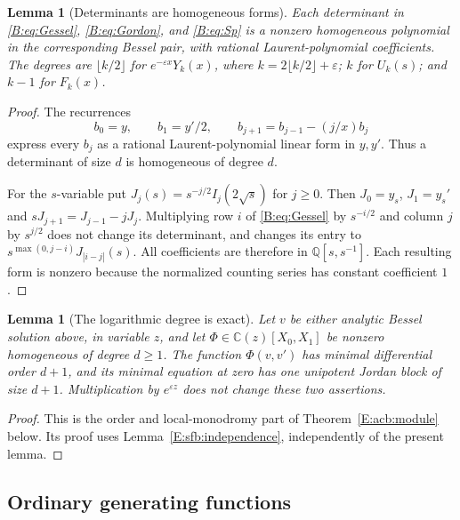 \documentclass[11pt,a4paper]{article}
\newtheorem{lemma}[theorem]{Lemma}
\theoremstyle{definition}
\theoremstyle{remark}
\numberwithin{equation}{section}
\begin{document}
\begin{lemma}[Determinants are homogeneous forms]\label{E:sfb:forms}
Each determinant in \eqref{B:eq:Gessel}, \eqref{B:eq:Gordon}, and \eqref{B:eq:Sp}
is a nonzero homogeneous polynomial in the corresponding Bessel
pair, with rational Laurent-polynomial coefficients.  The degrees
are $\lfloor k/2\rfloor$ for $e^{-\varepsilon x}Y_k(x)$,
where $k=2\lfloor k/2\rfloor+\varepsilon$; $k$ for $U_k(s)$;
and $k-1$ for $F_k(x)$.
\end{lemma}
\begin{proof}
The recurrences
\[
 b_0=y,\qquad b_1=y'/2,\qquad
 b_{j+1}=b_{j-1}-(j/x)b_j
\]
express every $b_j$ as a rational Laurent-polynomial linear
form in $y,y'$.  Thus a determinant of size $d$ is homogeneous
of degree $d$.

For the $s$-variable put
$J_j(s)=s^{-j/2}I_j(2\sqrt{s})$ for $j\ge0$.
Then $J_0=y_s$, $J_1=y_s'$ and
$sJ_{j+1}=J_{j-1}-jJ_j$.
Multiplying row $i$ of \eqref{B:eq:Gessel} by $s^{-i/2}$
and column $j$ by $s^{j/2}$ does not change its determinant,
and changes its entry to
$s^{\max(0,j-i)}J_{|i-j|}(s)$.
All coefficients are therefore in $\mathbb Q[s,s^{-1}]$.
Each resulting form is nonzero because the normalized counting
series has constant coefficient $1$.
\end{proof}

\begin{lemma}[The logarithmic degree is exact]\label{E:sfb:logblock}
Let $v$ be either analytic Bessel solution above, in variable $z$,
and let $\Phi\in\mathbb C(z)[X_0,X_1]$ be nonzero homogeneous
of degree $d\ge1$.  The function $\Phi(v,v')$ has minimal
differential order $d+1$, and its minimal equation at zero has
one unipotent Jordan block of size $d+1$.
Multiplication by $e^{\varepsilon z}$ does not change these
two assertions.
\end{lemma}
\begin{proof}
This is the order and local-monodromy part of
Theorem~\ref{E:acb:module} below. Its proof uses
Lemma~\ref{E:sfb:independence}, independently of the present lemma.
\end{proof}

\subsection{Ordinary generating functions}
\end{document}
